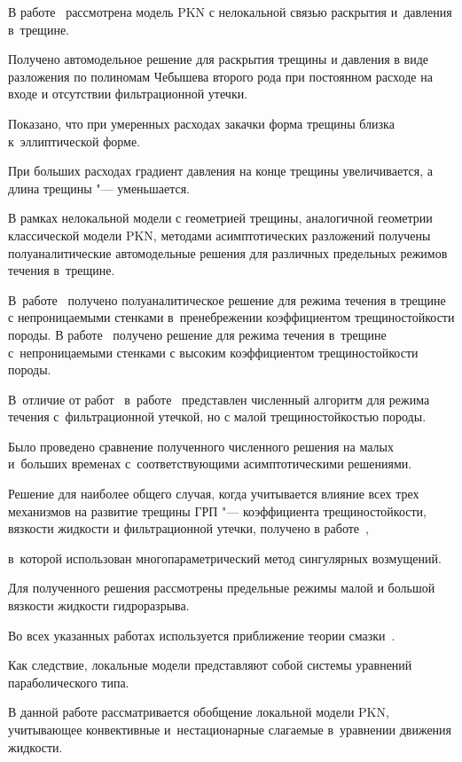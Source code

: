 В работе~\cite{Teod_tr1} рассмотрена модель PKN с нелокальной связью раскрытия и~давления в~трещине. 

Получено автомодельное решение для раскрытия трещины и давления в виде разложения по полиномам Чебышева второго рода при постоянном расходе на входе и отсутствии фильтрационной утечки. 

Показано, что при умеренных расходах закачки форма трещины близка к~эллиптической форме. 

При больших расходах градиент давления на конце трещины увеличивается, а длина трещины "--- уменьшается.



В рамках нелокальной модели с геометрией трещины, аналогичной геометрии классической модели PKN, методами асимптотических разложений получены полуаналитические автомодельные решения для различных предельных режимов течения в~трещине. 

В~работе~\cite{Garagash1} получено полуаналитическое решение для режима течения в трещине с непроницаемыми стенками в~пренебрежении коэффициентом трещиностойкости породы. В работе~\cite{Garagash2} получено решение для режима течения в~трещине с~непроницаемыми стенками с высоким коэффициентом трещиностойкости породы. 

В~отличие от работ~\cite{Garagash1, Garagash2} в~работе~\cite{Adachi1} представлен численный алгоритм для режима течения с~фильтрационной утечкой, но с малой трещиностойкостью породы. 

Было проведено сравнение полученного численного решения на малых и~больших временах с~соответствующими асимптотическими решениями. 

Решение для наиболее общего случая, когда учитывается влияние всех трех механизмов на развитие трещины ГРП "--- коэффициента трещиностойкости, вязкости жидкости и фильтрационной утечки, получено в работе~\cite{Mitchell1}, 

в~которой использован многопараметрический метод сингулярных возмущений. 

Для полученного решения рассмотрены предельные режимы малой и большой вязкости жидкости гидроразрыва. 

Во всех указанных работах используется приближение теории смазки~\cite{loic1}. 

Как следствие, локальные модели представляют собой системы уравнений параболического типа.



В данной работе рассматривается обобщение локальной модели PKN, учитывающее конвективные и~нестационарные слагаемые в~уравнении движения жидкости.





